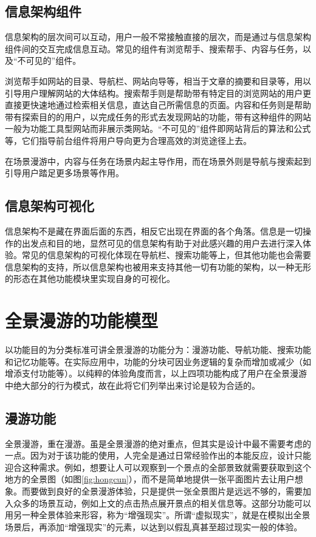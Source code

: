\subsection{信息架构组件}
信息架构的层次间可以互动，用户一般不常接触直接的层次，而是通过与信息架构组件间的交互完成信息互动。常见的组件有浏览帮手、搜索帮手、内容与任务，以及“不可见的”组件。

浏览帮手如网站的目录、导航栏、网站向导等，相当于文章的摘要和目录等，用以引导用户理解网站的大体结构。搜索帮手则是帮助带有特定目的浏览网站的用户更直接更快速地通过检索相关信息，直达自己所需信息的页面。内容和任务则是帮助带有探索目的的用户，以完成任务的形式去发现网站的功能，带有这种组件的网站一般为功能工具型网站而非展示类网站。“不可见的”组件即网站背后的算法和公式等，它们指导前台组件将用户导向更为合理高效的浏览途径上去。

在场景漫游中，内容与任务在场景内起主导作用，而在场景外则是导航与搜索起到引导用户踏足更多场景等作用。

\subsection{信息架构可视化}
信息架构不是藏在界面后面的东西，相反它出现在界面的各个角落。信息是一切操作的出发点和目的地，显然可见的信息架构有助于对此感兴趣的用户去进行深入体验。常见的信息架构的可视化体现在导航栏、搜索功能等上，但其他功能也会需要信息架构的支持，所以信息架构也被用来支持其他一切有功能的架构，以一种无形的形态在其他功能模块里实现自身的可视化。

\section{全景漫游的功能模型}
以功能目的为分类标准可讲全景漫游的功能分为：漫游功能、导航功能、搜索功能和记忆功能等。在实际应用中，功能的分块可因业务逻辑的复杂而增加或减少（如增添支付功能等）。以纯粹的体验角度而言，以上四项功能构成了用户在全景漫游中绝大部分的行为模式，故在此将它们列举出来讨论是较为合适的。

\subsection{漫游功能}
全景漫游，重在漫游。虽是全景漫游的绝对重点，但其实是设计中最不需要考虑的一点。因为对于该功能的使用，人完全是通过日常经验作出的本能反应，设计只能迎合这种需求。例如，想要让人可以观察到一个景点的全部景致就需要获取到这个地方的全景图（如图\ref{fig:hongcun}），而不是简单地提供一张平面图片去让用户想象。而要做到良好的全景漫游体验，只是提供一张全景图片是远远不够的，需要加入众多的场景互动，例如上文的点击热点展开景点的相关信息等。这部分功能可以用另一种全景体验来形容，称为“增强现实”。所谓“虚拟现实”，就是在模拟出全景场景后，再添加“增强现实”的元素，以达到以假乱真甚至超过现实一般的体验。

